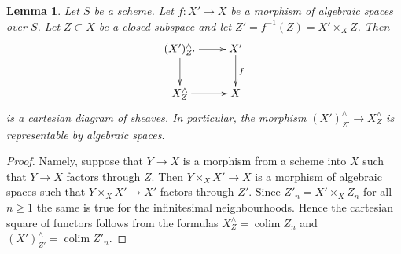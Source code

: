 \documentclass{stacks-project}
\theoremstyle{plain}
\newtheorem{lemma}[subsection]{Lemma}
\theoremstyle{definition}
\theoremstyle{remark}
\numberwithin{equation}{subsection}
\def\colim{\mathop{\mathrm{colim}}\nolimits}
\begin{document}
\begin{lemma}
\label{lemma-map-completions-subspaces-representable}
Let $S$ be a scheme. Let $f : X' \to X$ be a morphism
of algebraic spaces over $S$. Let $Z \subset X$
be a closed subspace and let $Z' = f^{-1}(Z) = X' \times_X Z$.
Then
$$
\xymatrix{
(X')^\wedge_{Z'} \ar[r] \ar[d] & X' \ar[d]^f \\
X^\wedge_Z \ar[r] & X
}
$$
is a cartesian diagram of sheaves. In particular, the morphism
$(X')^\wedge_{Z'} \to X^\wedge_Z$ is representable by algebraic spaces.
\end{lemma}

\begin{proof}
Namely, suppose that $Y \to X$ is a morphism from a scheme into $X$ such
that $Y \to X$ factors through $Z$. Then $Y \times_X X' \to X$
is a morphism of algebraic spaces such that $Y \times_X X' \to X'$
factors through $Z'$. Since $Z'_n = X' \times_X Z_n$ for all $n \geq 1$
the same is true for the infinitesimal neighbourhoods.
Hence the cartesian square of functors follows
from the formulas $X^\wedge_Z = \colim Z_n$ and
$(X')^\wedge_{Z'} = \colim Z'_n$.
\end{proof}
\end{document}
